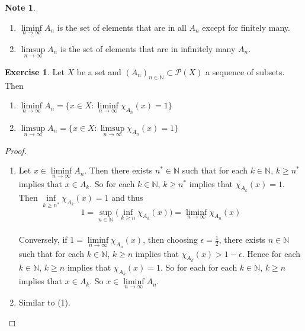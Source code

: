 \documentclass{book}
\theoremstyle{definition}
\newtheorem{note}[definition]{Note}
\newtheorem{ex}[definition]{Exercise}
\newcommand{\ep}{\epsilon}
\newcommand{\N}{\mathbb{N}}
\newcommand{\MP}{\mathcal{P}}
\newcommand{\lex}[1]{\label{ex:#1}}
\DeclareMathOperator*{\0}{\mbf{0}}
\DeclareMathOperator*{\1}{\mbf{1}}
\begin{document}
	\begin{note}\
		\begin{enumerate}
			\item $\liminf\limits_{n \rightarrow \infty} A_n$ is the set of elements that are in all $A_n$ except for finitely many. 
			
			\item $\limsup\limits_{n \rightarrow \infty} A_n$ is the set of elements that are in infinitely many $A_n$.
		\end{enumerate}
	\end{note}
	
	\begin{ex} \lex{00000} 
		Let $X$ be a set and $(A_n)_{n \in \N} \subset \MP(X)$ a sequence of subsets. Then 
		\begin{enumerate}
			\item $\liminf\limits_{n \rightarrow \infty}A_n = \bigg \{x \in X: \liminf\limits_{n \rightarrow \infty}\chi_{A_n}(x) = 1\bigg\}$
			\item $\limsup\limits_{n \rightarrow \infty}A_n = \bigg \{x \in X: \limsup\limits_{n \rightarrow \infty}\chi_{A_n}(x) = 1\bigg\}$
		\end{enumerate}
	\end{ex}
	
	\begin{proof}\
		\begin{enumerate}
			\item Let $x \in \liminf\limits_{n \rightarrow \infty}A_n$. Then there exists $n^* \in \N$ such that for each $k \in \N$, $k \geq n^*$ implies that $x \in A_k$. So for each $k \in \N$, $k \geq n^*$ implies that $\chi_{A_k}(x) = 1$. Then $\inf\limits_{k \geq n^*}\chi_{A_k}(x) = 1$ and thus $$1 = \sup\limits_{n \in \N} \bigg(\inf\limits_{k \geq n} \chi_{A_k}(x) \bigg) = \liminf_{n \rightarrow \infty}\chi_{A_n}(x)$$ \vspace{3mm} \\
			Conversely, if $1 = \liminf\limits_{n \rightarrow \infty}\chi_{A_n}(x)$, then choosing $\ep = \frac{1}{2}$, there exists $n \in \N$ such that for each $k \in \N$, $k \geq n$ implies that $\chi_{A_k}(x) > 1-\ep$. Hence for each $k \in \N$, $k \geq n$ implies that $\chi_{A_k}(x) = 1$. So for each for each $k \in \N$, $k \geq n$ implies that $x \in A_k$. So $x \in \liminf\limits_{n \rightarrow \infty} A_n$. 
			\item Similar to (1).
		\end{enumerate}
	\end{proof}
	
\end{document}
